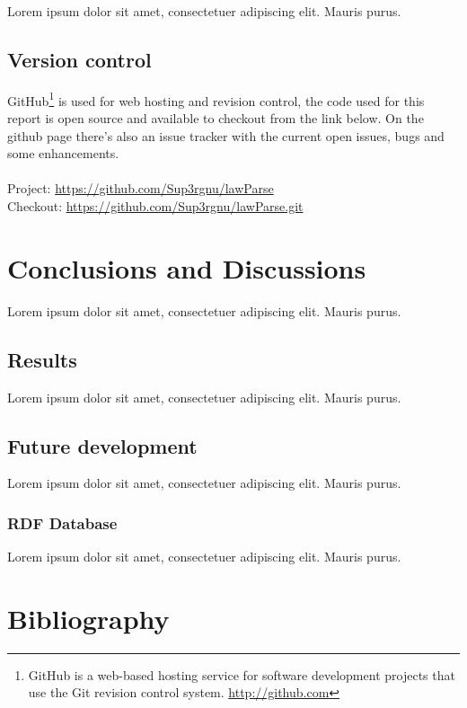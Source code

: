 \documentclass[a4paper,11pt]{kth-mag}
\begin{document}
Lorem ipsum dolor sit amet, consectetuer adipiscing elit. Mauris
purus. 

\section{Version control}

GitHub\footnote{GitHub is a web-based hosting service for software development
projects that use the Git revision control system. \url{http://github.com}} is
used for web hosting and revision control, the code used for this report is
open source and available to checkout from the link below. On the github page
there's also an issue tracker with the current open issues, bugs and some
enhancements.\\\\
Project: \url{https://github.com/Sup3rgnu/lawParse}\\
Checkout: \url{https://github.com/Sup3rgnu/lawParse.git}

\chapter{Conclusions and Discussions}

Lorem ipsum dolor sit amet, consectetuer adipiscing elit. Mauris
purus. 

\section{Results}

Lorem ipsum dolor sit amet, consectetuer adipiscing elit. Mauris
purus. 

\section{Future development}

Lorem ipsum dolor sit amet, consectetuer adipiscing elit. Mauris
purus. 

\subsection{RDF Database}

Lorem ipsum dolor sit amet, consectetuer adipiscing elit. Mauris
purus. 

\chapter*{Bibliography}
\end{document}
